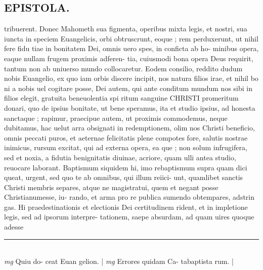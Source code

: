 \documentclass{article}
\begin{document}
\begin{pages}
\section*{EPISTOLA.  }\pstart tribuerent.  Donec Mahometh sua figmenta, operibus mixta legis, et nostri, sua iuncta in speciem Euangelicis, orbi obtruscrunt, eoque ; rem perduxerunt, ut nihil fere fidu tiae in bonitatem Dei, omnis uero spes, in conficta ab ho- minibus opera, eaque nullam frugem proximis adferen- tia, cuiusmodi bona opera Deus requirit, tantum non ab uniuerso mundo collocaretur.   \pend\pstart Eodem consilio, reddito dudum nobis Euangelio, ex quo iam orbis discere incipit, nos natura filios irae, et nihil bo ni a nobis uel cogitare posse, Dei autem, qui ante conditum mundum nos sibi in filios elegit, gratuita beneuolentia spi ritum sanguine CHRISTI promeritum donari, quo de ipsius bonitate, ut bene speramus, ita et studio ipsius, ad honesta sanctaque ; rapimur, praecipue autem, ut proximis commodemus, neque  dubitamus, hac uelut arra obsignati in redemptionem, olim nos Christi beneficio, omnis peccati puros, et aeternae felicitatis plene compotes fore, salutis nostrae inimicus, rursum excitat, qui ad externa opera, ea que ; non solum infrugifera, sed et noxia, a fidutia benignitatis diuinae, acriore, quam ulli antea studio, reuocare laborant.  Baptismum siquidem hi, imo rebaptismum supra quam dici queat, urgent, sed quo te ab omnibus, qui illum reiici- unt, quamlibet sanctis Christi membris separes, atque ne magistratui, quem et negant posse Christianumesse, iu- rando, et arma pro re publica sumendo obtempares, adstrin gas.  Hi praedestinationis et electionis Dei certitudinem rident, et in impletione legis, sed ad ipsorum interpre- tationem, saepe absurdam, ad quam uires quoque adesse  \pend
\vspace{0.5cm}\noindent
\vspace{0.2cm}\rule{1cm}{0.2pt}\\ 
\hspace{0.2cm}\textit{mg}
\footnotesize Quiu do- ceat Euan gelion.  
\normalsize| 
\hspace{0.2cm}\textit{mg}
\footnotesize Errores quidam Ca- tabaptista rum.  
\normalsize| 

\end{pages}
\end{document}
